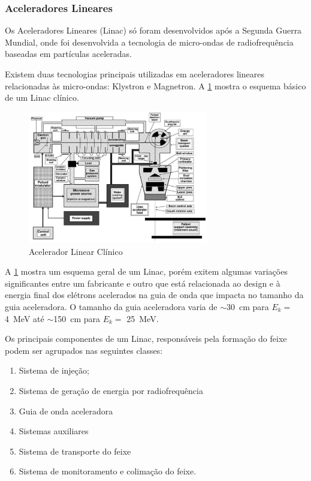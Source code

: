 \documentclass[11pt,a4paper]{article}
\begin{document}
\subsubsection*{Aceleradores Lineares}

    Os Aceleradores Lineares (Linac) só foram desenvolvidos após a Segunda Guerra Mundial, onde foi desenvolvida a tecnologia de micro-ondas de radiofrequência baseadas em partículas aceleradas. 

    Existem duas tecnologias principais utilizadas em aceleradores lineares relacionadas às micro-ondas: Klystron e Magnetron. A \ref{fig:esquemaAceleradorLinear} mostra o esquema básico de um Linac clínico.


                \begin{figure}[h]
                    \centering
                    \includegraphics[width=0.7\textwidth]{Imagens/esquemaAceleradorLinear.jpg}
                    \caption{Acelerador Linear Clínico}
                    \label{fig:esquemaAceleradorLinear}
                \end{figure}

            
    A \ref{fig:esquemaAceleradorLinear} mostra um esquema geral de um Linac, porém exitem algumas variações significantes entre um fabricante e outro que está relacionada ao design e à energia final dos elétrons acelerados na guia de onda que impacta no tamanho da guia aceleradora. O tamanho da guia aceleradora varia de $\sim $\qty{30}{cm} para $E_k = $ \qty{4}{MeV} até $\sim $\qty{150}{cm} para $E_k = $ \qty{25}{MeV}.

    Os principais componentes de um Linac, responsáveis pela formação do feixe podem ser agrupados nas seguintes classes:

    \begin{enumerate}
		\item Sistema de injeção;
		\item Sistema de geração de energia por radiofrequência
		\item Guia de onda aceleradora
		\item Sistemas auxiliares
		\item Sistema de transporte do feixe
		\item Sistema de monitoramento e colimação do feixe.
	\end{enumerate}            
            
\end{document}
